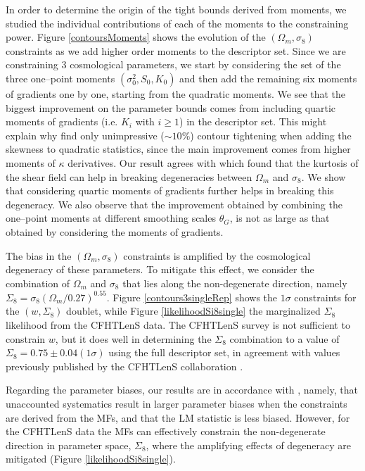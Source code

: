 \documentclass[reprint,aps,prd,superscriptaddress,showkeys,showpacs]{revtex4-1}
\begin{document}
In order to determine the origin of the tight bounds derived from moments, we studied the individual contributions of each of the moments to the constraining power. Figure \ref{contoursMoments} shows the evolution of the $(\Omega_m,\sigma_8)$ constraints as we add higher order moments to the descriptor set. Since we are constraining  3 cosmological parameters, we start by considering the set of the three one--point moments $(\sigma_0^2,S_0,K_0)$ and then add the remaining six moments of gradients one by one, starting from the quadratic moments. We see that the biggest improvement on the parameter bounds comes from including quartic moments of gradients (i.e. $K_i$ with $i\ge1$) in the descriptor set. This might explain why \citep{CFHTFu} find only unimpressive ($\sim10\%$) contour tightening when adding the skewness to quadratic statistics, since the main improvement comes from higher moments of $\kappa$ derivatives. Our result agrees with  \citep{moments4}  which found that the kurtosis of the shear field can help in breaking degeneracies between $\Omega_m$ and $\sigma_8$. We show that considering quartic moments of gradients further helps in breaking this degeneracy. We also observe that the improvement obtained by combining the one--point moments at different smoothing scales $\theta_G$, is not as large as that obtained by considering the moments of gradients.      

The bias in the $(\Omega_m,\sigma_8)$ constraints is amplified by the cosmological degeneracy of these parameters. To mitigate this effect, we consider the combination of $\Omega_m$ and $\sigma_8$ that lies along the non-degenerate direction, namely $\Sigma_8=\sigma_8(\Omega_m/0.27)^{0.55}$. Figure \ref{contours3singleRep} shows the $1\sigma$ constraints for the $(w,\Sigma_8)$ doublet, while Figure \ref{likelihoodSi8single} the marginalized $\Sigma_8$ likelihood from the CFHTLenS data. The CFHTLenS survey is not sufficient to constrain $w$, but it does well in determining the $\Sigma_8$ combination to a value of $\Sigma_8=0.75\pm0.04(1\sigma)$ using the full descriptor set, in agreement with values previously published by the CFHTLenS collaboration \citep{CFHTKilbinger}. 


Regarding the parameter biases, our results are in accordance with  \citep{PetriSpurious}, namely, that unaccounted systematics result in larger parameter biases when the constraints are derived from the MFs, and that the LM statistic is less biased. However, for the CFHTLenS data the MFs can effectively constrain the non-degenerate direction in parameter space, $\Sigma_8$, where the amplifying effects of degeneracy are mitigated (Figure \ref{likelihoodSi8single}). 
\end{document}
